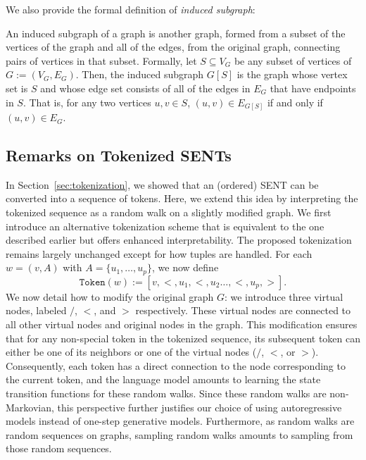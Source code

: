 We also provide the formal definition of \emph{induced subgraph}:
\begin{definition}
    An induced subgraph of a graph is another graph, formed from a subset of the vertices of the graph and all of the edges, from the original graph, connecting pairs of vertices in that subset. Formally, let $S\subseteq V_G$ be any subset of vertices of $G:=(V_G,E_G)$. Then, the induced subgraph $G[S]$ is the graph whose vertex set is $S$ and whose edge set consists of all of the edges in $E_G$ that have endpoints in $S$. That is, for any two vertices $u, v\in S$, $(u,v)\in E_{G[S]}$ if and only if $(u,v)\in E_G$.
\end{definition}

\subsection{Remarks on Tokenized SENTs}\label{app:sec:random_walk_interpretation}
In Section~\ref{sec:tokenization}, we showed that an (ordered) SENT can be converted into a sequence of tokens. Here, we extend this idea by interpreting the tokenized sequence as a random walk on a slightly modified graph. We first introduce an alternative tokenization scheme that is equivalent to the one described earlier but offers enhanced interpretability. The proposed tokenization remains largely unchanged except for how tuples are handled. For each $w=(v,A)$ with $A=\{u_1,\dots,u_p\}$, we now define
\begin{equation*}
    \texttt{Token}(w):=\left[v, \bm{<}, u_1, \bm{<}, u_2\dots, \bm{<}, u_p, \bm{>}\right].
\end{equation*}
We now detail how to modify the original graph $G$: we introduce three virtual nodes, labeled $\textbf{/}$, $\bm{<}$, and $\bm{>}$ respectively. These virtual nodes are connected to all other virtual nodes and original nodes in the graph. This modification ensures that for any non-special token in the tokenized sequence, its subsequent token can either be one of its neighbors or one of the virtual nodes ($\textbf{/}$, $\bm{<}$, or $\bm{>}$). Consequently, each token has a direct connection to the node corresponding to the current token, and the language model amounts to learning the state transition functions for these random walks. Since these random walks are non-Markovian, this perspective further justifies our choice of using autoregressive models instead of one-step generative models. Furthermore, as random walks are random sequences on graphs, sampling random walks amounts to sampling from those random sequences. 

